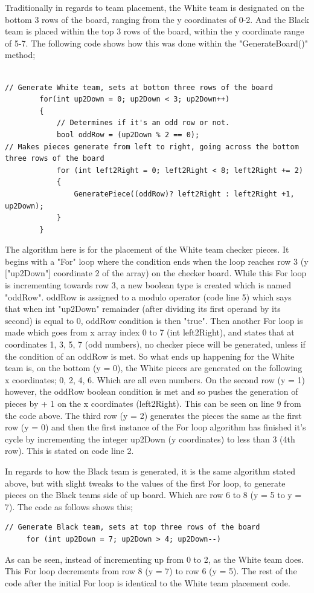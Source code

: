 \documentclass[10pt, a4paper]{article}
\begin{document}
	Traditionally in regards to team placement, the White team is designated on the bottom 3 rows of the board, ranging from the y coordinates of 0-2. And the Black team is placed within the top 3 rows of the board, within the y coordinate range of 5-7. The following code shows how this was done within the "GenerateBoard()" method;
\\
\\	
	\begin{lstlisting}[caption = EndTurn()]
// Generate White team, sets at bottom three rows of the board
        for(int up2Down = 0; up2Down < 3; up2Down++)
        {
            // Determines if it's an odd row or not.
            bool oddRow = (up2Down % 2 == 0);
// Makes pieces generate from left to right, going across the bottom three rows of the board
            for (int left2Right = 0; left2Right < 8; left2Right += 2)
            {
                GeneratePiece((oddRow)? left2Right : left2Right +1, up2Down);
            }
        }
	\end{lstlisting}
	The algorithm here is for the placement of the White team checker pieces. It begins with a "For" loop where the condition ends when the loop reaches row 3 (y ["up2Down"] coordinate 2 of the array) on the checker board. While this For loop is incrementing towards row 3, a new boolean type is created which is named "oddRow". oddRow is assigned to a modulo operator (code line 5) which says that when int "up2Down" remainder (after dividing its first operand by its second) is equal to 0, oddRow condition is then "true". Then another For loop is made which goes from x array index 0 to 7 (int left2Right), and states that at coordinates 1, 3, 5, 7 (odd numbers), no checker piece will be generated, unless if the condition of an oddRow is met. So what ends up happening for the White team is, on the bottom (y = 0), the White pieces are generated on the following x coordinates; 0, 2, 4, 6. Which are all even numbers. On the second row (y = 1) however, the oddRow boolean condition is met and so pushes the generation of pieces by + 1 on the x coordinates (left2Right). This can be seen on line 9 from the code above. The third row (y = 2) generates the pieces the same as the first row (y = 0) and then the first instance of the For loop algorithm has finished it's cycle by incrementing the integer up2Down (y coordinates) to less than 3 (4th row). This is stated on code line 2.
	 
	 In regards to how the Black team is generated, it is the same algorithm stated above, but with slight tweaks to the values of the first For loop, to generate pieces on the Black teams side of up board. Which are row 6 to 8 (y = 5 to y = 7). The code as follows shows this;
	 \begin{lstlisting}[caption = EndTurn()]
	 // Generate Black team, sets at top three rows of the board
	 for (int up2Down = 7; up2Down > 4; up2Down--)
	 \end{lstlisting}
	 As can be seen, instead of incrementing up from 0 to 2, as the White team does. This For loop decrements from row 8 (y = 7) to row 6 (y = 5). The rest of the code after the initial For loop is identical to the White team placement code.
	 
\end{document}
